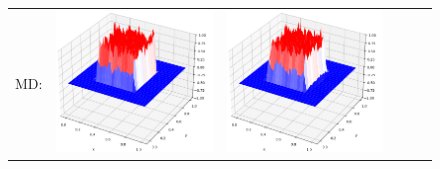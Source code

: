 \documentclass[12pt, reqno]{report}
\theoremstyle{definition}
\theoremstyle{remark}
\begin{document}
\begin{figure}[H]
\begin{tabular}{rccccc}
        MD: &
        \includegraphics[align = c, height=\subheight]{media_paper/surf_MD_n=0.png} &
        \includegraphics[align = c, height=\subheight]{media_paper/surf_MD_n=50.png} &

\end{tabular}
\end{figure}
\end{document}
